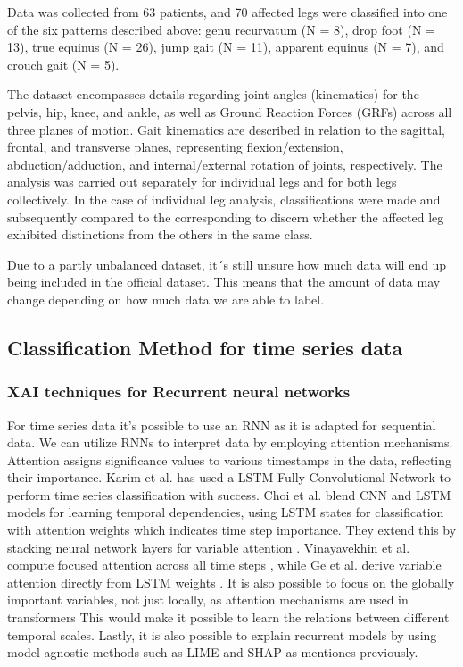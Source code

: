 \documentclass[UKenglish]{uiomasterthesis}
\begin{document}
Data was collected from 63 patients, and 70 affected legs were classified into one of the six patterns described above: genu recurvatum (N = 8), drop foot (N = 13), true equinus (N = 26), jump gait (N = 11), apparent equinus (N = 7), and crouch gait (N = 5). 

The dataset encompasses details regarding joint angles (kinematics) for the pelvis, hip, knee, and ankle, as well as Ground Reaction Forces (GRFs) across all three planes of motion. Gait kinematics are described in relation to the sagittal, frontal, and transverse planes, representing flexion/extension, abduction/adduction, and internal/external rotation of joints, respectively. The analysis was carried out separately for individual legs and for both legs collectively. In the case of individual leg analysis, classifications were made and subsequently compared to the corresponding to discern whether the affected leg exhibited distinctions from the others in the same class.

Due to a partly unbalanced dataset, it´s still unsure how much data will end up being included in the official dataset. This means that the amount of data may change depending on how much data we are able to label. 

\subsection{Classification Method for time series data}

\subsubsection{XAI techniques for Recurrent neural networks}
For time series data it's possible to use an RNN as it is adapted for sequential data. 
We can utilize RNNs to interpret data by employing attention mechanisms. Attention assigns significance values to various timestamps in the data, reflecting their importance. Karim et al. has used a LSTM Fully Convolutional Network to perform time series classification \cite{karim_lstm_2018} with success. 
Choi et al. blend CNN and LSTM models for learning temporal dependencies, using LSTM states for classification with attention weights which indicates time step importance. They extend this by stacking neural network layers for variable attention \cite{choi_prediction_2019}. Vinayavekhin et al. compute focused attention across all time steps \cite{vinayavekhin_focusing_2018}, while Ge et al. derive variable attention directly from LSTM weights \cite{ge_interpretable_nodate}.
It is also possible to focus on the globally important variables, not just locally, as attention mechanisms are used in transformers \cite{vaswani_attention_2023} This would make it possible to learn the relations between different temporal scales.
Lastly, it is also possible to explain recurrent models by using model agnostic methods such as LIME \cite{ribeiro_why_2016} and SHAP \cite{lundberg_unified_2017} as mentiones previously. 
\end{document}
